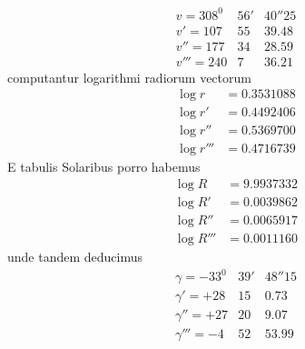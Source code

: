 \makebox[12mm][r]{}\par\nobreak\medskip
\[
\begin{array}{rrr}
v=308^0&56'&40''25\\
v'=107&55&39.48\\
v''=177&34&28.59\\
v'''=240&7&36.21
\end{array}
\]
computantur logarithmi radiorum vectorum
\[
\begin{aligned}
\log r&=0.3531088\\
\log r'&=0.4492406\\
\log r''&=0.5369700\\
\log r'''&=0.4716739
\end{aligned}
\]
E tabulis Solaribus porro habemus
\[
\begin{aligned}
\log R&=9.9937332\\
\log R'&=0.0039862\\
\log R''&=0.0065917\\
\log R'''&=0.0011160
\end{aligned}
\]
unde tandem deducimus
\[
\begin{array}{rrr}
\gamma=-33^0&39'&48''15\\
\gamma'=+28&15&0.73\\
\gamma''=+27&20&9.07\\
\gamma'''=-4&52&53.99
\end{array}
\]


